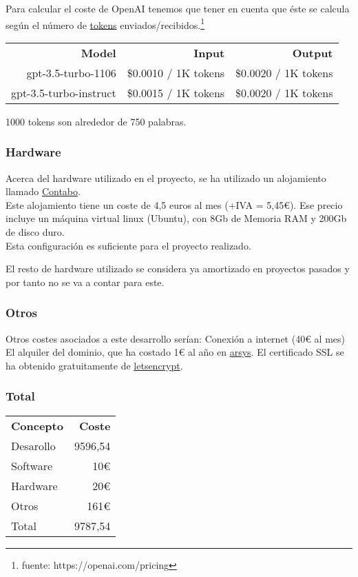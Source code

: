 Para calcular el coste de OpenAI tenemos que tener en cuenta que éste se calcula según el 
número de \href{https://platform.openai.com/tokenizer}{tokens} enviados/recibidos.\footnote{fuente: https://openai.com/pricing}

\begin{tabular}{r r r}
    \textbf{Model}&\textbf{Input}&\textbf{Output}\\
    gpt-3.5-turbo-1106 & \$0.0010 / 1K tokens & \$0.0020 / 1K tokens\\
    gpt-3.5-turbo-instruct & \$0.0015 / 1K tokens & \$0.0020 / 1K tokens\\        
\end{tabular}

1000 tokens son alrededor de 750 palabras.

\subsubsection{Hardware}
Acerca del hardware utilizado en el proyecto, se ha utilizado un alojamiento llamado \href{https://contabo.com/en/}{Contabo}.\\
Este alojamiento tiene un coste de 4,5 euros al mes (+IVA = 5,45€). 
Ese precio incluye un máquina virtual linux (Ubuntu),
con 8Gb de Memoria RAM y 200Gb de disco duro.\\
Esta configuración es suficiente para el proyecto realizado.

El resto de hardware utilizado se considera ya amortizado en proyectos 
pasados y por tanto no se va a contar para este.


\subsubsection{Otros}

Otros costes asociados a este desarrollo serían:
Conexión a internet (40€ al mes)
El alquiler del dominio, que ha costado 1€ al año en \href{https://www.arsys.es/}{arsys}.
El certificado SSL se ha obtenido gratuitamente de \href{https://letsencrypt.org/}{letsencrypt}.

\subsubsection{Total}

\begin{tabular}{l r}
    \textbf{Concepto} & \textbf{Coste}\\
    Desarollo &  9596,54\\
    Software & 10€\\
    Hardware & 20€\\
    Otros & 161€\\
    Total & 9787,54\\
\end{tabular}

